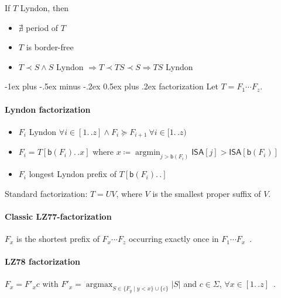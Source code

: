 \documentclass[10pt,landscape]{article}
\makeatletter
\renewcommand{\section}{\@startsection{section}{1}{0mm}%
                                {-1ex plus -.5ex minus -.2ex}%
                                {0.5ex plus .2ex}%
                                {\normalfont\large\itshape}}
\newcommand*{\IC}{\mathbin{{.}\,{.}}} %
\newcommand*{\abs}[1]{\ensuremath{|#1|}} %
\newcommand*{\menge}[1]{\ensuremath{\{#1\}}} %
\newcommand*{\instancename}[1]{\ensuremath{\mathsf{#1}}} %
\newcommand*{\ISA} {\instancename{ISA}}
\newcommand*{\textT}  {\ensuremath{T}}
\newcommand*{\textS}  {\ensuremath{S}}
\newcommand*{\ibeg}[1]{\mathsf{b}(#1)}%
\newcommand*{\argmax}{\operatorname{argmax}}
\newcommand*{\argmin}{\operatorname{argmin}}
\makeatother
\begin{document}
\begin{multicols}{2}
If $\textT$ Lyndon, then
\begin{multicols}{2}
\begin{itemize}
	\item $\nexists$ period of $\textT$
	\item $\textT$ is border-free
	\item $\textT \prec \textS \wedge \textS$ Lyndon $\Rightarrow \textT \prec \textT\textS \prec \textS \Rightarrow \textT \textS$ Lyndon \cite{chen58lyndon}
\end{itemize}
\end{multicols}

\section{factorization}
Let $\textT = F_1 \cdots F_z$.

\paragraph{Lyndon factorization}
	\begin{itemize}
	\item $F_i$ Lyndon  $\forall i \in [1\IC{}z] \wedge F_i \succeq F_{i+1}~\forall i\in[1\IC{}z)$  \cite{chen58lyndon}
		\item $F_i = \textT[\ibeg{F_i} \IC{} x]$ where $x \coloneqq \argmin_{j > \ibeg{F_i}} \ISA[j] > \ISA[\ibeg{F_i}]$
		\item $F_i$ longest Lyndon prefix of $\textT[\ibeg{F_i}\IC{}]$
	\end{itemize}

	Standard factorization: $T = UV$, where $V$ is the smallest proper suffix of $V$.


\newcommand*{\SubStrPrev}[2]{\mathcal{S}_{#1}(#2)}


\paragraph{Classic LZ77-factorization}
$F_x$ is the shortest prefix of $F_x \cdots F_z$ occurring exactly once in $F_1 \cdots F_x$~\cite{ziv77lz}.

\paragraph{LZ78 factorization}
$F_x=F'_x c$ with $F'_x = \argmax_{S \in \menge{F_y \mid y < x} \cup \menge{\varepsilon} } \abs{S}$ and $c\in\Sigma$, $\forall x \in [1\IC{} z]$~\cite{ziv78lz}.


\end{multicols}
\end{document}
